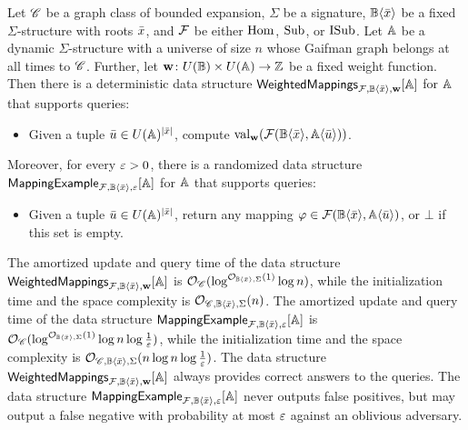 \begin{theorem}\label{thm:homcounts-relational}
	Let $\mathscr C$ be a graph class of bounded expansion, $\Sigma$ be a signature, $\mathbb{B}\langle {\bar{x}}\rangle$ be a fixed $\Sigma$-structure with roots ${\bar{x}}$, and $\mathcal{F}$ be either $\mathrm{Hom}$, $\mathrm{Sub}$, or $\mathrm{ISub}$. Let $\mathbb{A}$ be a dynamic $\Sigma$-structure with a universe of size $n$ whose Gaifman graph belongs at all times to $\mathscr C$. Further, let $\mathbf{w}\colon U(\mathbb{B})\times U(\mathbb{A})\to \mathbb{Z}$ be a fixed weight function. Then there is a deterministic data structure $\mathsf{WeightedMappings}_{\mathcal{F}, \mathbb{B}\langle {\bar{x}}\rangle,\mathbf{w}}[\mathbb{A}]$ for $\mathbb{A}$ that supports queries:
	\begin{itemize}
		\item Given a tuple ${\bar{u}}\in U(\mathbb{A})^{|{\bar{x}}|}$, compute $\mathrm{val}_{\mathbf{w}}(\mathcal{F}(\mathbb{B}\langle {\bar{x}}\rangle,\mathbb{A}\langle {\bar{u}}\rangle))$.
	\end{itemize}
	Moreover, for every $\varepsilon>0$, there is a randomized data structure $\mathsf{MappingExample}_{\mathcal{F}, \mathbb{B}\langle {\bar{x}}\rangle,\varepsilon}[\mathbb{A}]$ for $\mathbb{A}$ that supports queries:
	\begin{itemize}
		\item Given a tuple ${\bar{u}}\in U(\mathbb{A})^{|{\bar{x}}|}$, return any mapping $\varphi\in\mathcal{F}(\mathbb{B}\langle {\bar{x}}\rangle,\mathbb{A}\langle {\bar{u}}\rangle)$, or $\bot$ if this set is empty.
	\end{itemize}
	The amortized update and query time of the data structure $\mathsf{WeightedMappings}_{\mathcal{F}, \mathbb{B}\langle {\bar{x}}\rangle,\mathbf{w}}[\mathbb{A}]$ is $\mathcal{O}_{\mathscr C}(\log^{\mathcal{O}_{\mathbb{B}\langle {\bar{x}}\rangle,\Sigma}(1)} \log n)$, while the initialization time and the space complexity is $\mathcal{O}_{\mathscr C,\mathbb{B}\langle {\bar{x}}\rangle,\Sigma}(n)$. 
	The amortized update and query time of the data structure $\mathsf{MappingExample}_{\mathcal{F}, \mathbb{B}\langle {\bar{x}}\rangle,\varepsilon}[\mathbb{A}]$ is $\mathcal{O}_{\mathscr C}(\log^{\mathcal{O}_{\mathbb{B}\langle {\bar{x}}\rangle,\Sigma}(1)} \log n \log \tfrac{1}{\varepsilon})$, while the initialization time and the space complexity is $\mathcal{O}_{\mathscr C,\mathbb{B}\langle {\bar{x}}\rangle,\Sigma}(n\log n\log \tfrac{1}{\varepsilon})$. The data structure $\mathsf{WeightedMappings}_{\mathcal{F}, \mathbb{B}\langle {\bar{x}}\rangle,\mathbf{w}}[\mathbb{A}]$ always provides correct answers to the queries. The data structure $\mathsf{MappingExample}_{\mathcal{F}, \mathbb{B}\langle {\bar{x}}\rangle,\varepsilon}[\mathbb{A}]$ never outputs false positives, but may output a false negative with probability at most $\varepsilon$ against an oblivious adversary.
\end{theorem}
	
	
